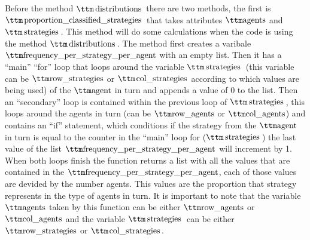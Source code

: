 Before the method $\pythoninline{distributions}$ there are two methods, the first is $\pythoninline{proportion\_classified\_strategies}$ that takes attributes $\pythoninline{agents}$ and $\pythoninline{strategies}$. This method will do some calculations when the code is using the method $\pythoninline{distributions}$.   The method first creates a varibale $\pythoninline{frequency\_per\_strategy\_per\_agent}$ with an empty list. Then it has a ``main'' ``for'' loop that loops around the variable $\pythoninline{strategies}$ (this variable can be $\pythoninline{row\_strategies}$ or $\pythoninline{col\_strategies}$ according to which values are being used) of the $\pythoninline{agent}$ in turn and appends a value of 0 to the list. Then an ``secondary'' loop is contained within the previous loop of $\pythoninline{strategies}$, this loops around the agents in turn (can be $\pythoninline{row\_agents}$ or $\pythoninline{col\_agents}$) and contains an ``if'' statement, which conditions if  the strategy from the $\pythoninline{agent}$ in turn is equal to the counter in the ``main'' loop for ($\pythoninline{strategies}$) the last value of the list $\pythoninline{frequency\_per\_strategy\_per\_agent}$ will increment by 1. When both loops finish the function returns a list with all the values that are contained in the $\pythoninline{frequency\_per\_strategy\_per\_agent}$, each of those values are devided by the number agents. This values are the proportion that strategy represents in the type of agents in turn. It is important to note that the variable $\pythoninline{agents}$ taken by this function can be either $\pythoninline{row\_agents}$ or $\pythoninline{col\_agents}$   and the variable $\pythoninline{strategies}$ can be either $\pythoninline{row\_strategies}$ or $\pythoninline{col\_strategies}$. 

